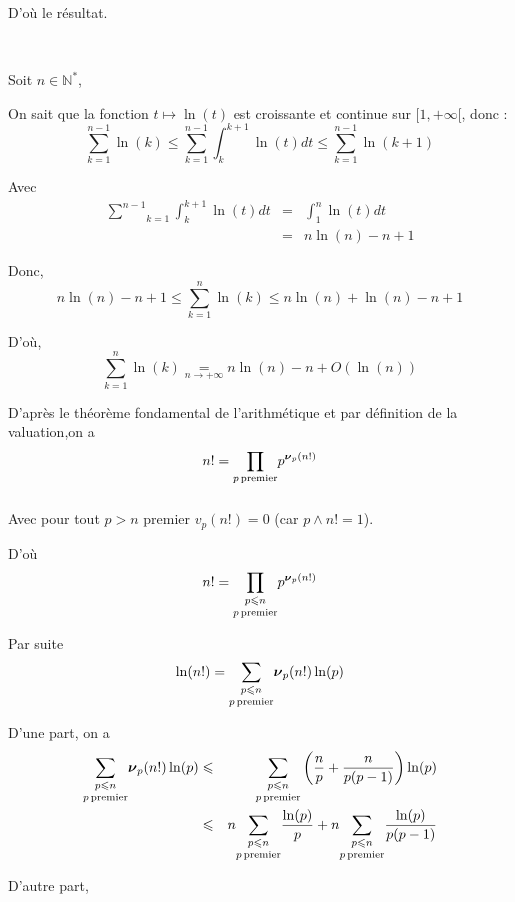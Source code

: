D'o{\`u} le r{\'e}sultat.

\

 Soit $n \in \mathbb{N}^{\ast}$,

On sait que la fonction $t \longmapsto \ln (t)$ est croissante et continue
sur $[1, + \infty [$, donc :
\[ \underset{k = 1}{\overset{n - 1}{\sum}} \ln (k) \leqslant \underset{k =
   1}{\overset{n - 1}{\sum}} \int^{k + 1}_k \ln (t) d t \leqslant \underset{k
   = 1}{\overset{n - 1}{\sum}} \ln (k + 1) \]


Avec
\begin{eqnarray*}
  \underset{k = 1}{\overset{n - 1}{\sum}} \int^{k + 1}_k \ln (t) d t & = &
  \int^n_1 \ln (t) d t\\
  & = & n \ln (n) - n + 1
\end{eqnarray*}


Donc,
\[ n \ln (n) - n + 1 \leqslant \underset{k = 1}{\overset{n}{\sum}} \ln (k)
   \leqslant n \ln (n) + \ln (n) - n + 1 \]


D'o{\`u},
\[ \underset{k = 1}{\overset{n}{\sum}} \ln (k) \underset{n \rightarrow +
   \infty}{=} n \ln (n) - n + O (\ln (n)) \]


 D'apr{\`e}s le th{\'e}or{\`e}me fondamental de
l'arithm{\'e}tique et par d{\'e}finition de la valuation,on a
\[ n! = \underset{}{\underset{p \operatorname{premier}}{\prod}} {p^{\boldsymbol{\nu}_p
   (n!)}}  \]


Avec pour tout $p > n$ premier $v_p (n!) = 0$ (car $p \wedge n! = 1$).

D'o{\`u}
\[ n! = \underset{p \operatorname{premier}}{\underset{p \leqslant n}{\prod}}
   {p^{\boldsymbol{\nu}_p (n!)}}  \]


Par suite
\[ \ln (n!) = \underset{p \operatorname{premier}}{\underset{p \leqslant n}{\sum}}
   \boldsymbol{\nu}_p (n!) \ln (p)  \]


D'une part, on a
\begin{eqnarray*}
  \underset{p \operatorname{premier}}{\underset{p \leqslant n}{\sum}} \boldsymbol{\nu}_p
  (n!) \ln (p) & \leqslant & \underset{p \operatorname{premier}}{\underset{p \leqslant
  n}{\sum}} \left( \frac{n}{p} + \frac{n}{p (p - 1)} \right) \ln (p)\\
  & \leqslant & n \underset{p \operatorname{premier}}{\underset{p \leqslant n}{\sum}}
  \frac{\ln (p)}{p} + n \underset{p \operatorname{premier}}{\underset{p \leqslant
  n}{\sum}} \frac{\ln (p)}{p (p - 1)}
\end{eqnarray*}


D'autre part,



